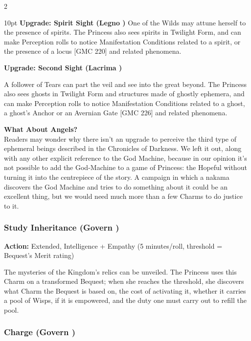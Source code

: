 \begin{multicols}{2}
\begin{myindentpar}{10pt}
\textbf{Upgrade: Spirit Sight (Legno \textbullet)}
One of the Wilds may attune herself to the presence of spirits. The Princess also sees spirits in Twilight Form, and can make Perception rolls to notice Manifestation Conditions related to a spirit, or the presence of a locus [GMC 220] and related phenomena.

\textbf{Upgrade: Second Sight (Lacrima \textbullet)}

A follower of Tears can part the veil and see into the great beyond. The Princess also sees ghosts in Twilight Form and structures made of ghostly ephemera, and can make Perception rolls to notice Manifestation Conditions related to a ghost, a ghost’s Anchor or an Avernian Gate [GMC 226] and related phenomena.\end{myindentpar}

\begin{mybox}

\noindent\textbf{What About Angels?} \\

\noindent Readers may wonder why there isn’t an upgrade to perceive the third type of ephemeral beings described in the Chronicles of Darkness. We left it out, along with any other explicit reference to the God Machine, because in our opinion it’s not possible to add the God-Machine to a game of Princess: the Hopeful without turning it into the centrepiece of the story. A campaign in which a nakama discovers the God Machine and tries to do something about it could be an excellent thing, but we would need much more than a few Charms to do justice to it.\end{mybox}


\subsubsection*{Study Inheritance (Govern \textbullet)}

\noindent \textbf{Action:} Extended, Intelligence + Empathy (5 minutes/roll, threshold = Bequest's Merit rating)

The mysteries of the Kingdom's relics can be unveiled. The Princess uses this Charm on a transformed Bequest; when she reaches the threshold, she discovers what Charm the Bequest is based on, the cost of activating it, whether it carries a pool of Wisps, if it is empowered, and the duty one must carry out to refill the pool.

\subsubsection*{Charge (Govern \textbullet\textbullet)}


\end{multicols}
